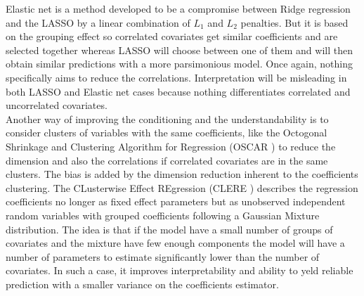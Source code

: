 \documentclass[11pt,a4paper]{article}
\begin{document}
	Elastic net \cite{zou2005regularization} is a method developed to be a compromise between Ridge regression and the \textsc{LASSO} by a linear combination of $L_1$ and $L_2$ penalties.
	But it is based on the grouping effect so correlated covariates get similar coefficients and are selected together whereas LASSO will choose between one of them and will then obtain similar predictions with a more parsimonious model. Once again, nothing specifically aims to reduce the correlations. Interpretation will be misleading in both LASSO and Elastic net cases because nothing differentiates correlated and uncorrelated covariates.
	\\
	
	Another way of improving the conditioning and the understandability is to consider clusters of variables with the same coefficients, like the Octogonal Shrinkage and Clustering Algorithm for Regression (\textsc{OSCAR} \cite{bondell2008simultaneous}) to reduce the dimension and also the correlations if correlated covariates are in the same clusters. The bias is added by the dimension reduction inherent to the coefficients clustering.
	The CLusterwise Effect REgression (\textsc{CLERE} \cite{yengo2012variable}) describes the regression coefficients no longer as fixed effect parameters but as unobserved independent random variables with grouped coefficients following a Gaussian Mixture distribution. The idea is that if the model have a small number of groups of covariates and the mixture have few enough components the model will have a number of parameters to estimate significantly lower than the number of covariates. In such a case, it improves interpretability and ability to yeld reliable prediction with a smaller variance on the coefficients estimator. 
	
\end{document}
